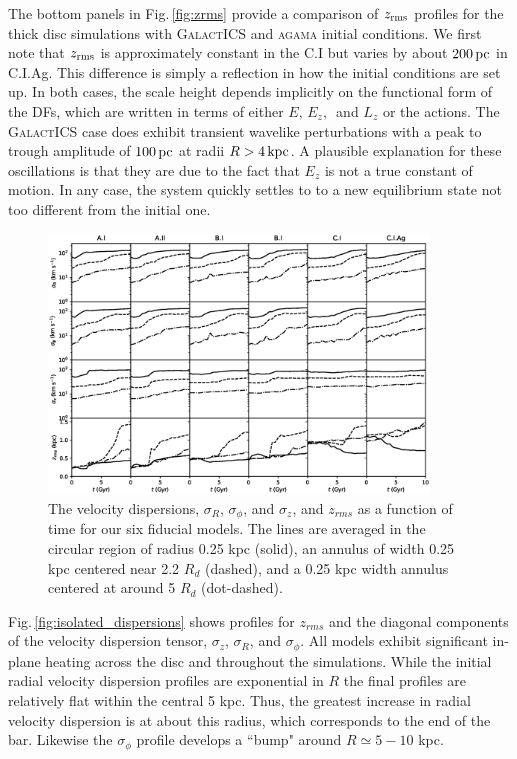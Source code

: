 The bottom panels in Fig.\,\ref{fig:zrms} provide a comparison of
$z_{\rm rms}$ profiles for the thick disc simulations with
\textsc{GalactICS} and \textsc{agama} initial conditions.  We first
note that $z_{\rm rms}$ is approximately constant in the C.I but varies by
about $200\,{\rm pc}$ in C.I.Ag.  This difference is simply a
reflection in how the initial conditions are set up.  In both cases,
the scale height depends implicitly on the functional form of the DFs,
which are written in terms of either $E,\,E_z,\,$ and $L_z$ or the
actions.  The \textsc{GalactICS} case does exhibit transient wavelike
perturbations with a peak to trough amplitude of $100\,{\rm pc}$ at
radii $R>4\,{\rm kpc}$.  A plausible explanation for these
oscillations is that they are due to the fact that $E_z$ is not a true
constant of motion.  In any case, the system quickly settles to to a
new equilibrium state not too different from the initial one.


\begin{figure}
\centering
\includegraphics[width=0.9\textwidth]{../figures/dispersions_vs_time.eps}
\caption{The velocity dispersions, $\sigma_R$, $\sigma_\phi$, and $\sigma_z$, and $z_{rms}$
as a function of time for our six fiducial models. The lines are averaged in the circular region
of radius 0.25 kpc (solid), an annulus of width 0.25 kpc centered near 2.2 $R_d$ (dashed),
and a 0.25 kpc width annulus centered at around 5 $R_d$ (dot-dashed). } \label{fig:dispersions_vs_time}
\end{figure}


Fig.\,\ref{fig:isolated_dispersions} shows profiles for $z_{rms}$ and the
diagonal components of the velocity dispersion tensor, $\sigma_z$,
$\sigma_R$, and $\sigma_\phi$.
{All models exhibit
significant in-plane heating across the disc and throughout the
simulations. While the initial radial velocity dispersion profiles are
exponential in $R$ the final profiles are relatively flat within the central 5
kpc. Thus, the greatest increase in radial velocity dispersion is at
about this radius, which corresponds to the end of the bar. Likewise
the $\sigma_\phi$ profile develops a ``bump" around
$R\simeq 5-10$ kpc.}

